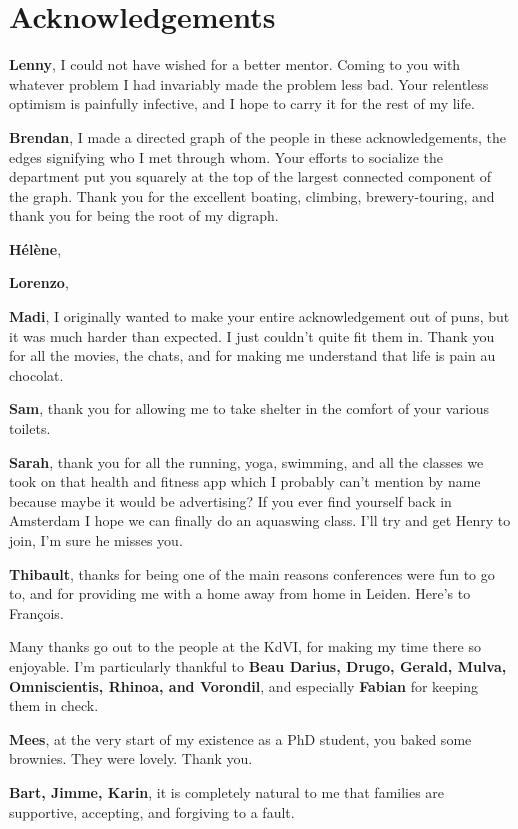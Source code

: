 \chapter*{Acknowledgements}
{\bfseries Lenny}, I could not have wished for a better mentor. Coming to you with whatever problem I had invariably made the problem less bad. Your relentless optimism is painfully infective, and I hope to carry it for the rest of my life.

{\bfseries Brendan}, I made a directed graph of the people in these acknowledgements, the edges signifying who I met through whom. Your efforts to socialize the department put you squarely at the top of the largest connected component of the graph. Thank you for the excellent boating, climbing, brewery-touring, and thank you for being the root of my digraph.

{\bfseries H\'el\`ene},

{\bfseries Lorenzo},

{\bfseries Madi}, I originally wanted to make your entire acknowledgement out of puns, but it was much harder than expected. I just couldn't quite fit them in. Thank you for all the movies, the chats, and for making me understand that life is pain au chocolat.

{\bfseries Sam}, thank you for allowing me to take shelter in the comfort of your various toilets.

{\bfseries Sarah}, thank you for all the running, yoga, swimming, and all the classes we took on that health and fitness app which I probably can't mention by name because maybe it would be advertising? If you ever find yourself back in Amsterdam I hope we can finally do an aquaswing class. I'll try and get Henry to join, I'm sure he misses you.

{\bfseries Thibault}, thanks for being one of the main reasons conferences were fun to go to, and for providing me with a home away from home in Leiden. Here's to Fran\c{c}ois.

Many thanks go out to the people at the KdVI, for making my time there so enjoyable. I'm particularly thankful to {\bfseries Beau Darius, Drugo, Gerald, Mulva, Omniscientis, Rhinoa, and Vorondil}, and especially {\bfseries Fabian} for keeping them in check.  

{\bfseries Mees}, at the very start of my existence as a PhD student, you baked some brownies. They were lovely. Thank you.

{\bfseries Bart, Jimme, Karin}, it is completely natural to me that families are supportive, accepting, and forgiving to a fault. 


